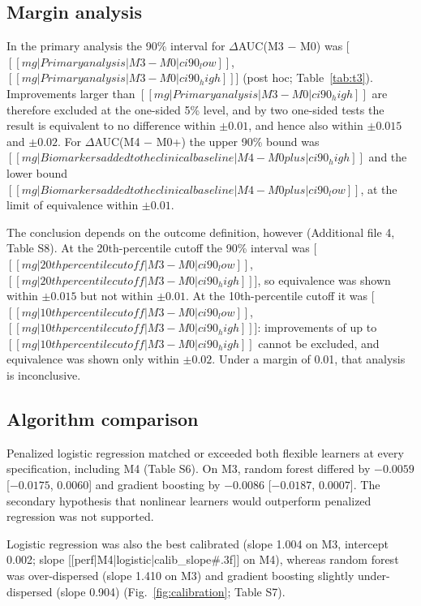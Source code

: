 \documentclass[12pt]{article}
\newcommand{\deltaauc}{$\Delta$AUC}
\begin{document}
\subsection*{Margin analysis}

In the primary analysis the 90\% interval for \deltaauc(M3 $-$ M0) was [$[[mg|Primary analysis|M3 - M0|ci90_low]]$, $[[mg|Primary analysis|M3 - M0|ci90_high]]$] (post hoc; Table~\ref{tab:t3}). Improvements larger than $[[mg|Primary analysis|M3 - M0|ci90_high]]$ are therefore excluded at the one-sided 5\% level, and by two one-sided tests the result is equivalent to no difference within $\pm 0.01$, and hence also within $\pm 0.015$ and $\pm 0.02$. For \deltaauc(M4 $-$ M0+) the upper 90\% bound was $[[mg|Biomarkers added to the clinical baseline|M4 - M0plus|ci90_high]]$ and the lower bound $[[mg|Biomarkers added to the clinical baseline|M4 - M0plus|ci90_low]]$, at the limit of equivalence within $\pm 0.01$.

The conclusion depends on the outcome definition, however (Additional file 4, Table S8). At the 20th-percentile cutoff the 90\% interval was [$[[mg|20th percentile cutoff|M3 - M0|ci90_low]]$, $[[mg|20th percentile cutoff|M3 - M0|ci90_high]]$], so equivalence was shown within $\pm 0.015$ but not within $\pm 0.01$. At the 10th-percentile cutoff it was [$[[mg|10th percentile cutoff|M3 - M0|ci90_low]]$, $[[mg|10th percentile cutoff|M3 - M0|ci90_high]]$]: improvements of up to $[[mg|10th percentile cutoff|M3 - M0|ci90_high]]$ cannot be excluded, and equivalence was shown only within $\pm 0.02$. Under a margin of 0.01, that analysis is inconclusive.

\subsection*{Algorithm comparison}

Penalized logistic regression matched or exceeded both flexible learners at every specification, including M4 (Table S6). On M3, random forest differed by $-0.0059$ [$-0.0175$, $0.0060$] and gradient boosting by $-0.0086$ [$-0.0187$, $0.0007$]. The secondary hypothesis that nonlinear learners would outperform penalized regression was not supported.

Logistic regression was also the best calibrated (slope 1.004 on M3, intercept 0.002; slope [[perf|M4|logistic|calib_slope#.3f]] on M4), whereas random forest was over-dispersed (slope 1.410 on M3) and gradient boosting slightly under-dispersed (slope 0.904) (Fig.~\ref{fig:calibration}; Table S7).
\end{document}
